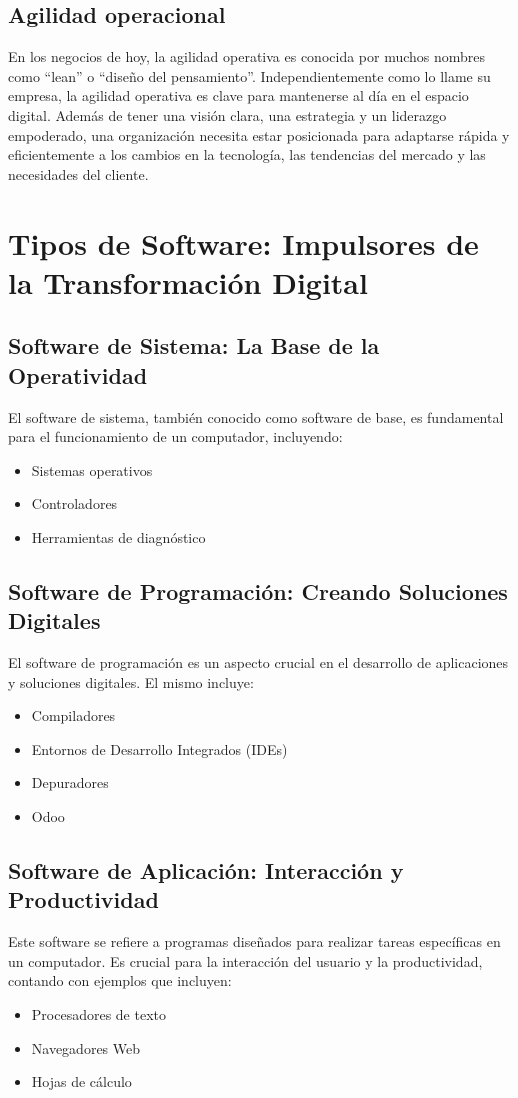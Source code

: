 \documentclass[12pt]{article}
\begin{document}
\subsection*{Agilidad operacional}
En los negocios de hoy, la agilidad operativa es conocida por muchos nombres como “lean” o “diseño del pensamiento”. Independientemente como lo llame su empresa, la agilidad operativa es clave para mantenerse al día en el espacio digital. Además de tener una visión clara, una estrategia y un liderazgo empoderado, una organización necesita estar posicionada para adaptarse rápida y eficientemente a los cambios en la tecnología, las tendencias del mercado y las necesidades del cliente.

\section*{Tipos de Software: Impulsores de la Transformación Digital}

\subsection*{Software de Sistema: La Base de la Operatividad}
El software de sistema, también conocido como software de base, es fundamental para el funcionamiento de un computador, incluyendo: 
\begin{itemize}
\item  Sistemas operativos
\item Controladores
\item  Herramientas de diagnóstico
\end{itemize}


\subsection*{Software de Programación: Creando Soluciones Digitales}
El software de programación es un aspecto crucial en el desarrollo de aplicaciones y soluciones digitales. El mismo incluye:
\begin{itemize}
\item  Compiladores
\item Entornos de Desarrollo Integrados (IDEs)
\item  Depuradores
\item Odoo
\end{itemize}

\subsection*{Software de Aplicación: Interacción y Productividad}
Este software se refiere a programas diseñados para realizar tareas específicas en un computador. Es crucial para la interacción del usuario y la productividad, contando con ejemplos que incluyen:
\begin{itemize}
\item  Procesadores de texto
\item Navegadores Web
\item  Hojas de cálculo
\end{itemize}
\end{document}
